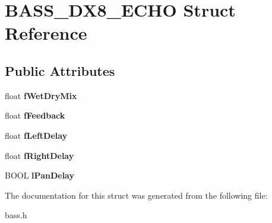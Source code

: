 \hypertarget{structBASS__DX8__ECHO}{}\section{B\+A\+S\+S\+\_\+\+D\+X8\+\_\+\+E\+C\+H\+O Struct Reference}
\label{structBASS__DX8__ECHO}
\subsection*{Public Attributes}
\begin{DoxyCompactItemize}
\item 
\hypertarget{structBASS__DX8__ECHO_a6c2c28866ef373a669f059f335b6e0f6}{}float {\bfseries f\+Wet\+Dry\+Mix}\label{structBASS__DX8__ECHO_a6c2c28866ef373a669f059f335b6e0f6}

\item 
\hypertarget{structBASS__DX8__ECHO_af0b5c7c7657e2c96594f328f4e864949}{}float {\bfseries f\+Feedback}\label{structBASS__DX8__ECHO_af0b5c7c7657e2c96594f328f4e864949}

\item 
\hypertarget{structBASS__DX8__ECHO_a191fa91199c5fe5577e01f245cc9eee9}{}float {\bfseries f\+Left\+Delay}\label{structBASS__DX8__ECHO_a191fa91199c5fe5577e01f245cc9eee9}

\item 
\hypertarget{structBASS__DX8__ECHO_a75637c3dcdc3336ff8b6a5dd119af276}{}float {\bfseries f\+Right\+Delay}\label{structBASS__DX8__ECHO_a75637c3dcdc3336ff8b6a5dd119af276}

\item 
\hypertarget{structBASS__DX8__ECHO_a60032ed3f9846743ae53468309006a39}{}B\+O\+O\+L {\bfseries l\+Pan\+Delay}\label{structBASS__DX8__ECHO_a60032ed3f9846743ae53468309006a39}

\end{DoxyCompactItemize}


The documentation for this struct was generated from the following file\+:\begin{DoxyCompactItemize}
\item 
bass.\+h\end{DoxyCompactItemize}
